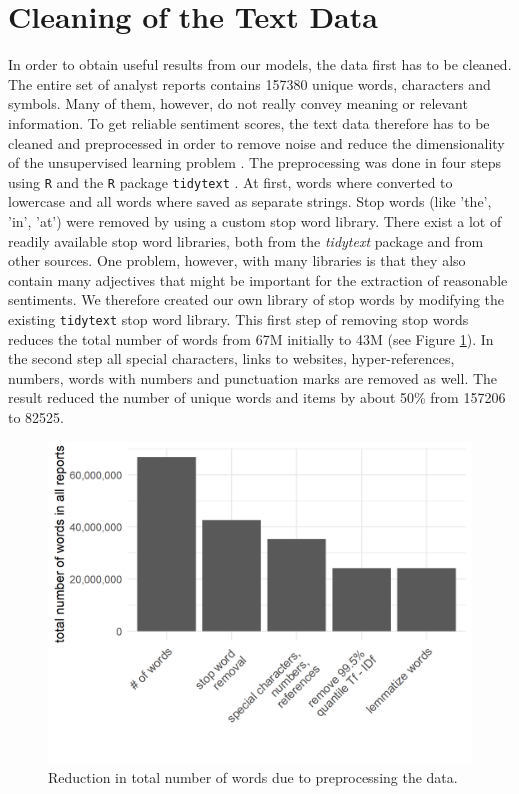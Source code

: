 \section{Cleaning of the Text Data}\label{cleaningText}
In order to obtain useful results from our models, the data first has to be cleaned. The entire set of analyst reports contains 157380 unique words, characters and symbols. Many of them, however, do not really convey meaning or relevant information. To get reliable sentiment scores, the text data therefore has to be cleaned and preprocessed in order to remove noise and reduce the dimensionality of the unsupervised learning problem \citep{HADDI201326}. The preprocessing was done in four steps using \texttt{R} \citep{Rproject} and the \texttt{R} package \texttt{tidytext} \citep{tidytext}. At first, words where converted to lowercase and all words where saved as separate strings. Stop words (like 'the', 'in', 'at') were removed by using a custom stop word library. There exist a lot of readily available stop word libraries, both from the \textit{tidytext} package and from other sources. One problem, however, with many libraries is that they also contain many adjectives that might be important for the extraction of reasonable sentiments. We therefore created our own library of stop words by modifying the existing \texttt{tidytext} stop word library. This first step of removing stop words reduces the total number of words from 67M initially to 43M (see Figure \ref{fig:TotWord}). In the second step all special characters, links to websites, hyper-references, numbers, words with numbers and punctuation marks are removed as well. The result reduced the number of unique words and items by about 50\% from 157206 to 82525.  \\ 
\begin{figure}[h]
\centering
\begin{adjustbox}{width = 0.75\textwidth}
\includegraphics[width=\textwidth]{figures/ReductionInTotalNWords.png}
\end{adjustbox}
\caption{Reduction in total number of words due to preprocessing the data.}
\label{fig:TotWord}
\end{figure}


